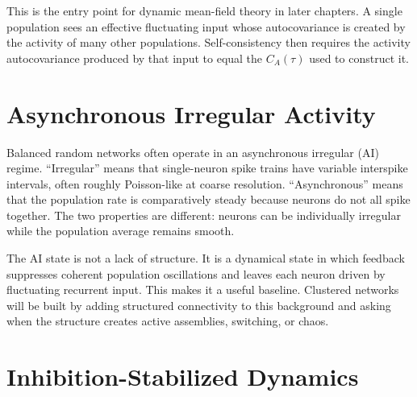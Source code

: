 This is the entry point for dynamic mean-field theory in later chapters. A
single population sees an effective fluctuating input whose autocovariance is
created by the activity of many other populations. Self-consistency then
requires the activity autocovariance produced by that input to equal the
$C_A(\tau)$ used to construct it.

\section{Asynchronous Irregular Activity}
\label{sec:ai-activity}

Balanced random networks often operate in an asynchronous irregular (AI)
regime. ``Irregular'' means that single-neuron spike trains have variable
interspike intervals, often roughly Poisson-like at coarse resolution.
``Asynchronous'' means that the population rate is comparatively steady because
neurons do not all spike together. The two properties are different: neurons can
be individually irregular while the population average remains smooth.

The AI state is not a lack of structure. It is a dynamical state in which
feedback suppresses coherent population oscillations and leaves each neuron
driven by fluctuating recurrent input. This makes it a useful baseline. Clustered
networks will be built by adding structured connectivity to this background and
asking when the structure creates active assemblies, switching, or chaos.

\section{Inhibition-Stabilized Dynamics}
\label{sec:inhibition-stabilized}

